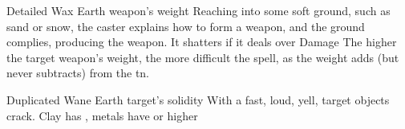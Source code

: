 \ifodd\value{diceNo}

  {Detailed}%
  {Wax}%
  {Earth}%
  {weapon's \gls{weight}}%
  {Reaching into some soft ground, such as sand or snow, the caster explains how to form a weapon, and the ground complies, producing the weapon.
  It shatters if it deals over  Damage}%
  {
    The higher the target weapon's \gls{weight}, the more difficult the spell, as the \gls{weight} adds (but never subtracts) from the \gls{tn}.
  }

\else

  {Duplicated}%
  {Wane}%
  {Earth}%
  {target's solidity}%
  {With a fast, loud, yell,  target objects crack.
  Clay has \tn[9], metals have \tn[14] or higher}%
  {}

\fi
{}

